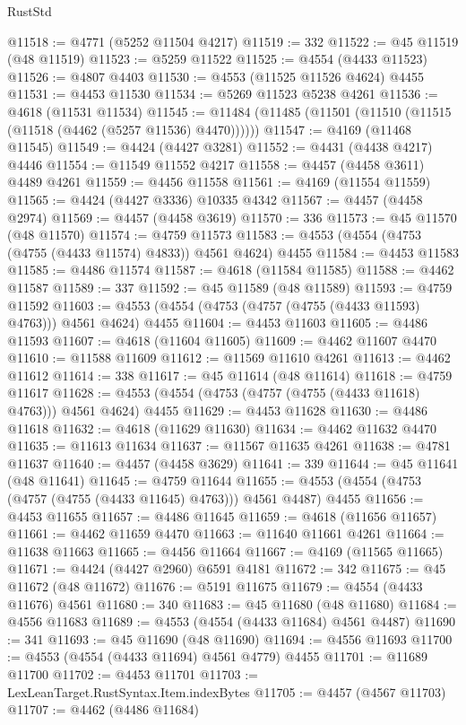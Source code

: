 \begin{lexlean}{RustStd}
\begin{coremodule}
@11518 := @4771 (@5252 @11504 @4217)
@11519 := 332
@11522 := @45 @11519 (@48 @11519)
@11523 := @5259 @11522
@11525 := @4554 (@4433 @11523)
@11526 := @4807 @4403
@11530 := @4553 (@11525 @11526 @4624) @4455
@11531 := @4453 @11530
@11534 := @5269 @11523 @5238 @4261
@11536 := @4618 (@11531 @11534)
@11545 := @11484 (@11485 (@11501 (@11510 (@11515 (@11518 (@4462 (@5257 @11536) @4470))))))
@11547 := @4169 (@11468 @11545)
@11549 := @4424 (@4427 @3281)
@11552 := @4431 (@4438 @4217) @4446
@11554 := @11549 @11552 @4217
@11558 := @4457 (@4458 @3611) @4489 @4261
@11559 := @4456 @11558
@11561 := @4169 (@11554 @11559)
@11565 := @4424 (@4427 @3336) @10335 @4342
@11567 := @4457 (@4458 @2974)
@11569 := @4457 (@4458 @3619)
@11570 := 336
@11573 := @45 @11570 (@48 @11570)
@11574 := @4759 @11573
@11583 := @4553 (@4554 (@4753 (@4755 (@4433 @11574) @4833)) @4561 @4624) @4455
@11584 := @4453 @11583
@11585 := @4486 @11574
@11587 := @4618 (@11584 @11585)
@11588 := @4462 @11587
@11589 := 337
@11592 := @45 @11589 (@48 @11589)
@11593 := @4759 @11592
@11603 := @4553 (@4554 (@4753 (@4757 (@4755 (@4433 @11593) @4763))) @4561 @4624) @4455
@11604 := @4453 @11603
@11605 := @4486 @11593
@11607 := @4618 (@11604 @11605)
@11609 := @4462 @11607 @4470
@11610 := @11588 @11609
@11612 := @11569 @11610 @4261
@11613 := @4462 @11612
@11614 := 338
@11617 := @45 @11614 (@48 @11614)
@11618 := @4759 @11617
@11628 := @4553 (@4554 (@4753 (@4757 (@4755 (@4433 @11618) @4763))) @4561 @4624) @4455
@11629 := @4453 @11628
@11630 := @4486 @11618
@11632 := @4618 (@11629 @11630)
@11634 := @4462 @11632 @4470
@11635 := @11613 @11634
@11637 := @11567 @11635 @4261
@11638 := @4781 @11637
@11640 := @4457 (@4458 @3629)
@11641 := 339
@11644 := @45 @11641 (@48 @11641)
@11645 := @4759 @11644
@11655 := @4553 (@4554 (@4753 (@4757 (@4755 (@4433 @11645) @4763))) @4561 @4487) @4455
@11656 := @4453 @11655
@11657 := @4486 @11645
@11659 := @4618 (@11656 @11657)
@11661 := @4462 @11659 @4470
@11663 := @11640 @11661 @4261
@11664 := @11638 @11663
@11665 := @4456 @11664
@11667 := @4169 (@11565 @11665)
@11671 := @4424 (@4427 @2960) @6591 @4181
@11672 := 342
@11675 := @45 @11672 (@48 @11672)
@11676 := @5191 @11675
@11679 := @4554 (@4433 @11676) @4561
@11680 := 340
@11683 := @45 @11680 (@48 @11680)
@11684 := @4556 @11683
@11689 := @4553 (@4554 (@4433 @11684) @4561 @4487)
@11690 := 341
@11693 := @45 @11690 (@48 @11690)
@11694 := @4556 @11693
@11700 := @4553 (@4554 (@4433 @11694) @4561 @4779) @4455
@11701 := @11689 @11700
@11702 := @4453 @11701
@11703 := LexLeanTarget.RustSyntax.Item.indexBytes
@11705 := @4457 (@4567 @11703)
@11707 := @4462 (@4486 @11684)

\end{coremodule}
\end{lexlean}
